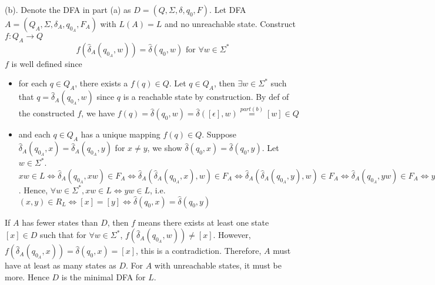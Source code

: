 \documentclass[12pt]{article}
\begin{document}
\noindent (b). Denote the DFA in part (a) as \(D = (Q, \Sigma, \delta, q_{0}, F)\). Let DFA \(A = (Q_{A}, \Sigma, \delta_{A}, q_{0_{A}}, F_{A})\) with \(L(A) = L\) and no unreachable state. Construct \(f : Q_A \to Q\)
\begin{equation}
  f(\hat{\delta}_A(q_{0_{A}}, w)) = \hat{\delta}(q_0, w) \text{ for } \forall w \in \Sigma^*
\end{equation}
\(f\) is well defined since
\begin{itemize}
  \item for each \(q \in Q_{A}\), there exists a \(f(q) \in Q\). Let \(q \in Q_A\), then \(\exists w \in \Sigma^*\) such that \(q = \hat{\delta}_A(q_{0_{A}}, w)\) since \(q\) is a reachable state by construction. By def of the constructed \(f\), we have \(f(q) = \hat{\delta}(q_0, w) = \hat{\delta}([\epsilon], w) \overset{part (b)}{=} [w] \in Q\)
  \item and each \(q \in Q_{A}\) has a unique mapping \(f(q) \in Q\). Suppose \(\hat{\delta}_A(q_{0_{A}}, x) = \hat{\delta}_A(q_{0_{A}}, y)\) for \(x \neq y\), we show \(\hat{\delta}(q_0, x) = \hat{\delta}(q_0, y)\). Let \(w \in \Sigma^*\). \(xw \in L \Leftrightarrow \hat{\delta}_A(q_{0_{A}}, xw) \in F_A \Leftrightarrow \hat{\delta}_A(\hat{\delta}_A(q_{0_{A}}, x), w) \in F_A \Leftrightarrow \hat{\delta}_A(\hat{\delta}_A(q_{0_{A}}, y), w) \in F_A \Leftrightarrow \hat{\delta}_A(q_{0_{A}}, yw) \in F_A \Leftrightarrow yw \in L\). Hence, \(\forall w \in \Sigma^*, xw \in L \Leftrightarrow yw \in L\), i.e. \((x,y) \in R_L \Leftrightarrow [x] = [y] \Leftrightarrow \hat{\delta}(q_0, x) = \hat{\delta}(q_0, y)\)
\end{itemize}
If \(A\) has fewer states than \(D\), then \(f\) means there exists at least one state \([x] \in D\) such that for \(\forall w \in \Sigma^*\), \(f(\hat{\delta}_A(q_{0_{A}}, w)) \neq [x]\). However, \(f(\hat{\delta}_A(q_{0_{A}}, x)) = \hat{\delta}(q_0, x) = [x]\), this is a contradiction. Therefore, \(A\) must have at least as many states as \(D\). For \(A\) with unreachable states, it must be more. Hence \(D\) is the minimal DFA for \(L\). 
\end{document}
